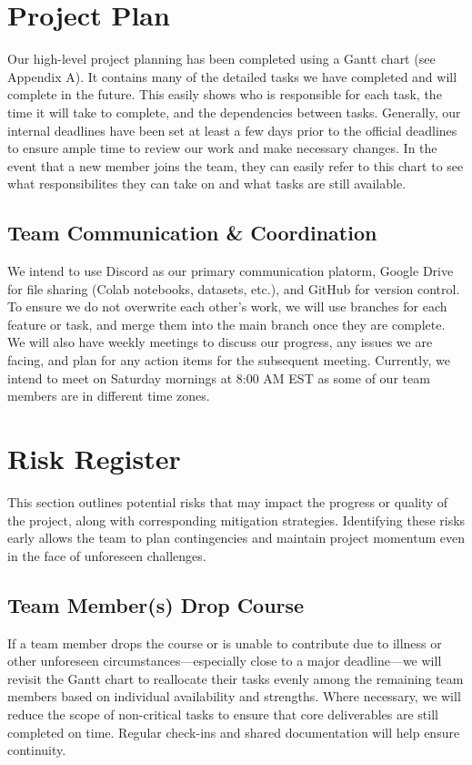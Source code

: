 \documentclass{article} %
\begin{document}
\section{Project Plan}
\label{project_plan}

Our high-level project planning has been completed using a Gantt chart (see Appendix A). It contains many of the detailed tasks we have completed and will complete in the future. This
easily shows who is responsible for each task, the time it will take to complete, and the dependencies between tasks. Generally, our internal deadlines have been set at least a 
few days prior to the official deadlines to ensure ample time to review our work and make necessary changes. In the event that a new member joins the team, they can easily
refer to this chart to see what responsibilites they can take on and what tasks are still available.

\subsection{Team Communication \& Coordination}

We intend to use Discord as our primary communication platorm, Google Drive for file sharing (Colab notebooks, datasets, etc.), and GitHub for version control. To ensure we do 
not overwrite each other's work, we will use branches for each feature or task, and merge them into the main branch once they are complete. We will also have weekly meetings to
discuss our progress, any issues we are facing, and plan for any action items for the subsequent meeting. Currently, we intend to meet on Saturday mornings at 8:00 AM EST as some
of our team members are in different time zones.

\section{Risk Register}
\label{risk_register}

This section outlines potential risks that may impact the progress or quality of the project, along with corresponding mitigation 
strategies. Identifying these risks early allows the team to plan contingencies and maintain project momentum even in the face 
of unforeseen challenges.

\subsection{Team Member(s) Drop Course}
If a team member drops the course or is unable to contribute due to illness or other unforeseen circumstances—especially close to a major 
deadline—we will revisit the Gantt chart to reallocate their tasks evenly among the remaining team members 
based on individual availability and strengths. Where necessary, we will reduce the scope of non-critical tasks to ensure that 
core deliverables are still completed on time. Regular check-ins and shared documentation will help ensure continuity.
\end{document}
